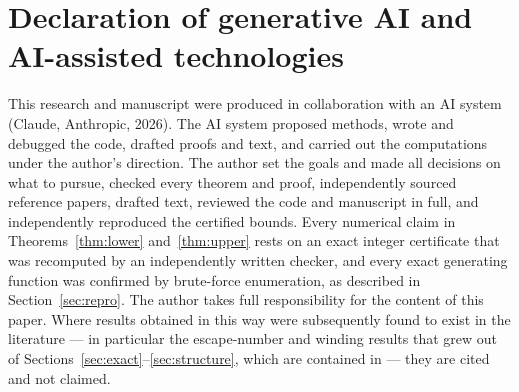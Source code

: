 \documentclass[11pt]{amsart}
\theoremstyle{definition}
\begin{document}
\section*{Declaration of generative AI and AI-assisted technologies}
This research and manuscript were produced in collaboration with an AI system (Claude, Anthropic, 2026). The AI system proposed methods, wrote and debugged the code, drafted proofs and text, and carried out the computations under the author's direction. The author set the goals and made all decisions on what to pursue, checked every theorem and proof, independently sourced reference papers, drafted text, reviewed the code and manuscript in full, and independently reproduced the certified bounds. Every numerical claim in Theorems~\ref{thm:lower} and~\ref{thm:upper} rests on an exact integer certificate that was recomputed by an independently written checker, and every exact generating function was confirmed by brute-force enumeration, as described in Section~\ref{sec:repro}. The author takes full responsibility for the content of this paper. Where results obtained in this way were subsequently found to exist in the literature --- in particular the escape-number and winding results that grew out of Sections~\ref{sec:exact}--\ref{sec:structure}, which are contained in \cite{DFGG96} --- they are cited and not claimed.
\end{document}
